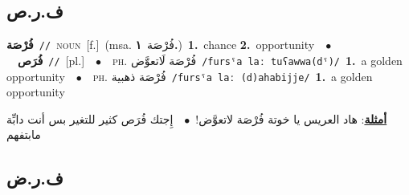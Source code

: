 \documentclass[10pt,a4paper,twoside]{article} %
\begin{document}
\begin{multicols}{2}
\vspace{-3mm}
\subsection*{\color{blue}\foreignlanguage{arabic}{ف.ر.ص}\color{blue}{}} 

{\setlength\topsep{0pt}\textbf{\foreignlanguage{arabic}{فُرْصَة}}\ {\color{gray}\texttt{//}\color{black}}\ \textsc{noun}\ [f.]\ \color{gray}(msa. \foreignlanguage{arabic}{فُرْصَة}~\foreignlanguage{arabic}{\textbf{١.}})\color{black}\ \textbf{1.}~chance  \textbf{2.}~opportunity\ \ $\bullet$\ \ \setlength\topsep{0pt}\textbf{\foreignlanguage{arabic}{فُرَص}}\ {\color{gray}\texttt{//}\color{black}}\ [pl.]\ \ $\bullet$\ \ \textsc{ph.} \color{gray} \foreignlanguage{arabic}{فُرْصَة لَاتعوَّض}\color{black}\ {\color{gray}\texttt{/{\sffamily fursˤa laː tuʕawwa(dˤ)}/}\color{black}}\ \textbf{1.}~a golden opportunity\ \ $\bullet$\ \ \textsc{ph.} \color{gray} \foreignlanguage{arabic}{فُرْصَة ذهبية}\color{black}\ {\color{gray}\texttt{/{\sffamily fursˤa laː (d)ahabijje}/}\color{black}}\ \textbf{1.}~a golden opportunity\  \begin{flushright}\color{gray}\foreignlanguage{arabic}{\textbf{\underline{\foreignlanguage{arabic}{أمثلة}}}: هاد العريس يا خوتة فُرْصَة لاتعوَّض!\ $\bullet$\ \  إِجتك فُرَص كثير للتغير بس أنت دابِّة مابتفهم}\end{flushright}\color{black}} \vspace{2mm}

\vspace{-3mm}
\subsection*{\color{blue}\foreignlanguage{arabic}{ف.ر.ض}\color{blue}{}} 


\end{multicols}
\end{document}
